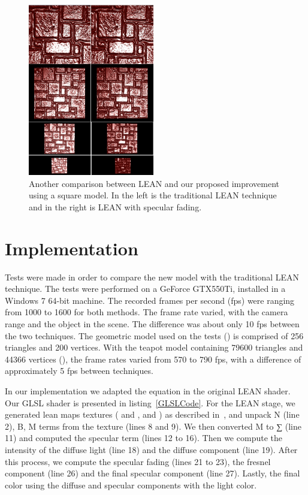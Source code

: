 \documentclass[10pt, conference]{IEEEtran}
\begin{document}
\begin{figure}[here]
\includegraphics[width=0.49\textwidth]{figs/LS2.png}
\caption{Another comparison between LEAN and our proposed improvement using a square model. In the left is the traditional LEAN technique and in the right is LEAN with specular fading.}
\label{fig:LS2}
\end{figure}

\section{Implementation}
\label{sec:implementation}

Tests were made in order to compare the new model with the traditional LEAN technique. The tests were performed on a GeForce GTX550Ti, installed in a Windows 7 64-bit machine. The recorded frames per second (fps) were ranging from 1000 to 1600 for both methods. The frame rate varied, with the camera range and the object in the scene. The difference was about only 10 fps between the two techniques. The geometric model used on the tests () is comprised of 256 triangles and 200 vertices. With the teapot model containing 79600 triangles and 44366 vertices (), the frame rates varied from 570 to 790 fps, with a difference of approximately 5 fps between techniques.

In our implementation we adapted the equation in the original LEAN shader. Our GLSL shader is presented in listing~\ref{GLSLCode}. For the LEAN stage, we generated lean maps textures ( and ,  and ) as described in~\cite{Olano:2010:LM:1730804.1730834}, and unpack N (line 2), B, M terms from the texture (lines 8 and 9). We then converted M to ∑ (line 11) and computed the specular term (lines 12 to 16). Then we compute the intensity of the diffuse light (line 18) and the diffuse component (line 19). After this process, we compute the specular fading (lines 21 to 23), the fresnel component (line 26) and the final specular component (line 27). Lastly, the final color using the diffuse and specular components with the light color.
\end{document}
